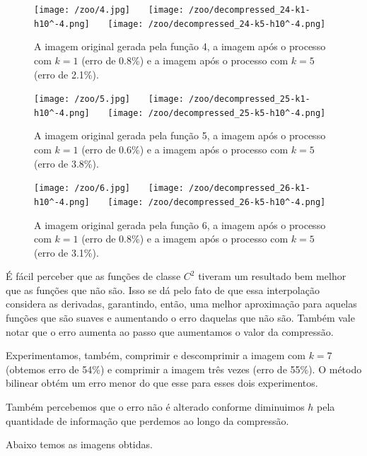 \documentclass{article}
\begin{document}
		\begin{figure}[H]
			\centering
			\captionsetup{justification=centering}
			\texttt{[image: /zoo/4.jpg]} \ \ \
			\texttt{[image: /zoo/decompressed\_24-k1-h10^-4.png]} \ \ \
			\texttt{[image: /zoo/decompressed\_24-k5-h10^-4.png]} \\
			\caption{A imagem original gerada pela função 4, a imagem após o processo com $k = 1$ (erro de 0.8\%) e a imagem após o processo com $k = 5$ (erro de 2.1\%).} 
		\end{figure}\par
		
		\begin{figure}[H]
			\centering
			\captionsetup{justification=centering}
			\texttt{[image: /zoo/5.jpg]} \ \ \
			\texttt{[image: /zoo/decompressed\_25-k1-h10^-4.png]} \ \ \
			\texttt{[image: /zoo/decompressed\_25-k5-h10^-4.png]} \\
			\caption{A imagem original gerada pela função 5, a imagem após o processo com $k = 1$ (erro de 0.6\%) e a imagem após o processo com $k = 5$ (erro de 3.8\%).} 
		\end{figure}\par
		\begin{figure}[H]
			\centering
			\captionsetup{justification=centering}
			\texttt{[image: /zoo/6.jpg]} \ \ \
			\texttt{[image: /zoo/decompressed\_26-k1-h10^-4.png]} \ \ \
			\texttt{[image: /zoo/decompressed\_26-k5-h10^-4.png]} \\
			\caption{A imagem original gerada pela função 6, a imagem após o processo com $k = 1$ (erro de 0.8\%) e a imagem após o processo com $k = 5$ (erro de 3.1\%).} 
		\end{figure}\par
		É fácil perceber que as funções de classe $C^2$ tiveram um resultado bem melhor que as funções que não são. Isso se dá pelo fato de que essa interpolação considera as derivadas, garantindo, então, uma melhor aproximação para aquelas funções que são suaves e aumentando o erro daquelas que não são. Também vale notar que o erro aumenta ao passo que aumentamos o valor da compressão. \par
		Experimentamos, também, comprimir e descomprimir a imagem com $k = 7$ (obtemos erro de 54\%) e comprimir a imagem três vezes (erro de 55\%). O método bilinear obtém um erro menor do que esse para esses dois experimentos. \par
		Também percebemos que o erro não é alterado conforme diminuimos $h$ pela quantidade de informação que perdemos ao longo da compressão.\par
		Abaixo temos as imagens obtidas.
\end{document}
